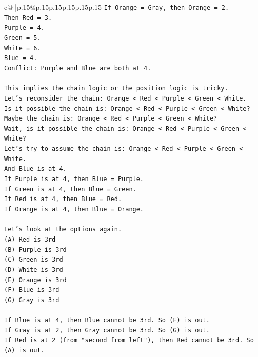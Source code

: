 \documentclass{article}
\begin{document}
{\begin{supertabular}{c@{$\;$}|p{.15\linewidth}@{}p{.15\linewidth}p{.15\linewidth}p{.15\linewidth}p{.15\linewidth}p{.15\linewidth}}
{{{\texttt{If Orange = Gray, then Orange = 2.} \\
\texttt{Then Red = 3.} \\
\texttt{Purple = 4.} \\
\texttt{Green = 5.} \\
\texttt{White = 6.} \\
\texttt{Blue = 4.} \\
\texttt{Conflict: Purple and Blue are both at 4.} \\
\\ 
\texttt{This implies the chain logic or the position logic is tricky.} \\
\texttt{Let's reconsider the chain: Orange < Red < Purple < Green < White.} \\
\texttt{Is it possible the chain is: Orange < Red < Purple < Green < White?} \\
\texttt{Maybe the chain is: Orange < Red < Purple < Green < White?} \\
\texttt{Wait, is it possible the chain is: Orange < Red < Purple < Green < White?} \\
\texttt{Let's try to assume the chain is: Orange < Red < Purple < Green < White.} \\
\texttt{And Blue is at 4.} \\
\texttt{If Purple is at 4, then Blue = Purple.} \\
\texttt{If Green is at 4, then Blue = Green.} \\
\texttt{If Red is at 4, then Blue = Red.} \\
\texttt{If Orange is at 4, then Blue = Orange.} \\
\\ 
\texttt{Let's look at the options again.} \\
\texttt{(A) Red is 3rd} \\
\texttt{(B) Purple is 3rd} \\
\texttt{(C) Green is 3rd} \\
\texttt{(D) White is 3rd} \\
\texttt{(E) Orange is 3rd} \\
\texttt{(F) Blue is 3rd} \\
\texttt{(G) Gray is 3rd} \\
\\ 
\texttt{If Blue is at 4, then Blue cannot be 3rd. So (F) is out.} \\
\texttt{If Gray is at 2, then Gray cannot be 3rd. So (G) is out.} \\
\texttt{If Red is at 2 (from "second from left"), then Red cannot be 3rd. So (A) is out.} \\
}}}
\end{supertabular}}
\end{document}
